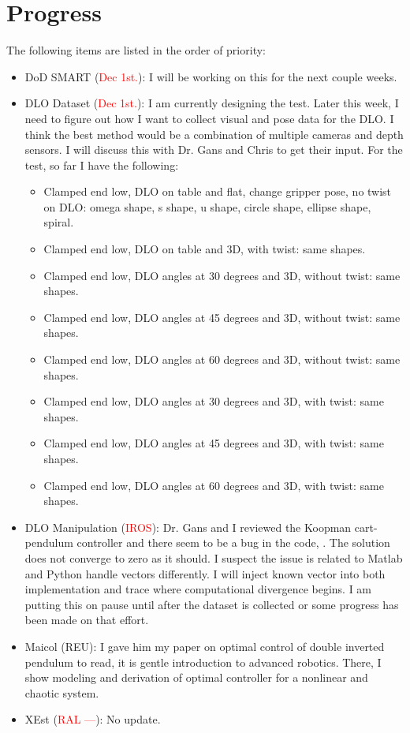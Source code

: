 \documentclass[11pt]{article}
\begin{document}
\section{Progress}
The following items are listed in the order of priority:
\begin{itemize}
    \item DoD SMART (\textcolor{red}{Dec 1st.}): I will be working on this for
    the next couple weeks.\\
    \item DLO Dataset (\textcolor{red}{Dec 1st.}): I am currently designing the
    test. Later this week, I need to figure out how I want to collect visual and
    pose data for the DLO. I think the best method would be a combination of
    multiple cameras and depth sensors. I will discuss this with Dr. Gans and
    Chris to get their input. For the test, so far I have the following:
    \begin{itemize}
      \item Clamped end low, DLO on table and flat, change gripper pose, no
      twist on DLO: omega shape, s shape, u shape, circle shape, ellipse shape,
      spiral.\
      \item Clamped end low, DLO on table and 3D, with twist: same shapes.
      \item Clamped end low, DLO angles at 30 degrees and 3D, without twist: same shapes.
      \item Clamped end low, DLO angles at 45 degrees and 3D, without twist: same shapes.
      \item Clamped end low, DLO angles at 60 degrees and 3D, without twist: same shapes.
      \item Clamped end low, DLO angles at 30 degrees and 3D, with twist: same shapes.
      \item Clamped end low, DLO angles at 45 degrees and 3D, with twist: same shapes.
      \item Clamped end low, DLO angles at 60 degrees and 3D, with twist: same shapes.
    \end{itemize}

    \item DLO Manipulation (\textcolor{red}{IROS}):
    Dr. Gans and I reviewed the Koopman cart-pendulum controller and there seem
    to be a bug in the code, \cite{abraham2017model}. The solution does not
    converge to zero as it should. I suspect the issue is related to Matlab and
    Python handle vectors differently. I will inject known vector into both
    implementation and trace where computational divergence begins. I am putting
    this on pause until after the dataset is collected or some progress has been
    made on that effort.\\
    \item Maicol (REU): I gave him my paper on optimal control of double
    inverted pendulum to read, it is gentle introduction to advanced robotics.
    There, I show modeling and derivation of optimal controller for a nonlinear
    and chaotic system. \\
    \item XEst (\textcolor{red}{RAL ---}): No update.\\
  \end{itemize}
\newpage

\newpage


\end{document}
